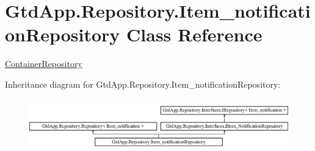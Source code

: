 \hypertarget{class_gtd_app_1_1_repository_1_1_item__notification_repository}{}\section{Gtd\+App.\+Repository.\+Item\+\_\+notification\+Repository Class Reference}
\label{class_gtd_app_1_1_repository_1_1_item__notification_repository}


\mbox{\hyperlink{class_gtd_app_1_1_repository_1_1_container_repository}{Container\+Repository}}  


Inheritance diagram for Gtd\+App.\+Repository.\+Item\+\_\+notification\+Repository\+:\begin{figure}[H]
\begin{center}
\leavevmode
\includegraphics[height=2.288828cm]{class_gtd_app_1_1_repository_1_1_item__notification_repository}
\end{center}
\end{figure}
